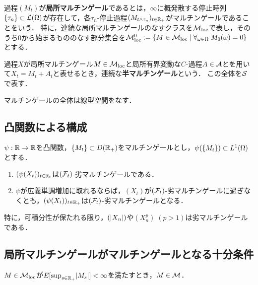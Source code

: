 \documentclass[uplatex,dvipdfmx]{jsreport}
\begin{document}
\begin{definition}
    過程$(M_t)$が\textbf{局所マルチンゲール}であるとは，$\infty$に概発散する停止時列$\{\tau_n\}\subset\L(\Om)$が存在して，各$\tau_n$-停止過程$(M_{t\land\tau_n})_{t\in\R_+}$がマルチンゲールであることをいう．
    特に，連続な局所マルチンゲールのなすクラスを$\M_\loc$で表し，そのうち$0$から始まるもののなす部分集合を$\M_\loc^0:=\Brace{M\in\M_\loc\mid\forall_{\om\in\Om}\;M_0(\om)=0}$とする．
\end{definition}

\begin{definition}[semimartingale]
    過程$X$が局所マルチンゲール$M\in\M_\loc$と局所有界変動な$C$-過程$A\in\A$とを用いて$X_t=M_t+A_t$と表せるとき，連続な\textbf{半マルチンゲール}という．
    この全体を$\S$で表す．
\end{definition}

\begin{proposition}
    [劣]マルチンゲールの全体は線型空間をなす．
\end{proposition}

\subsection{凸関数による構成}

\begin{theorem}
    $\psi:\R\to\R$を凸関数，$\{M_t\}\subset D(\R_+)$をマルチンゲールとし，$\psi(\{M_t\})\subset L^1(\Om)$とする．
    \begin{enumerate}
        \item $(\psi(X_t))_{t\in\R_t}$は$(\F_t)$-劣マルチンゲールである．
        \item $\psi$が広義単調増加に取れるならば，$(X_t)$が$(\F_t)$-劣マルチンゲールに過ぎなくとも，$(\psi(X_t))_{t\in\R_+}$は$(\F_t)$-劣マルチンゲールとなる．
    \end{enumerate}
\end{theorem}

\begin{example}
    特に，可積分性が保たれる限り，$(\abs{X_n})$や$(X_n^p)\;(p>1)$は劣マルチンゲールである．
\end{example}

\subsection{局所マルチンゲールがマルチンゲールとなる十分条件}

\begin{proposition}
    $M\in\M_\loc$が$E[\sup_{s\in\R_+}\abs{M_s}]<\infty$を満たすとき，$M\in\M$．
\end{proposition}
\end{document}
